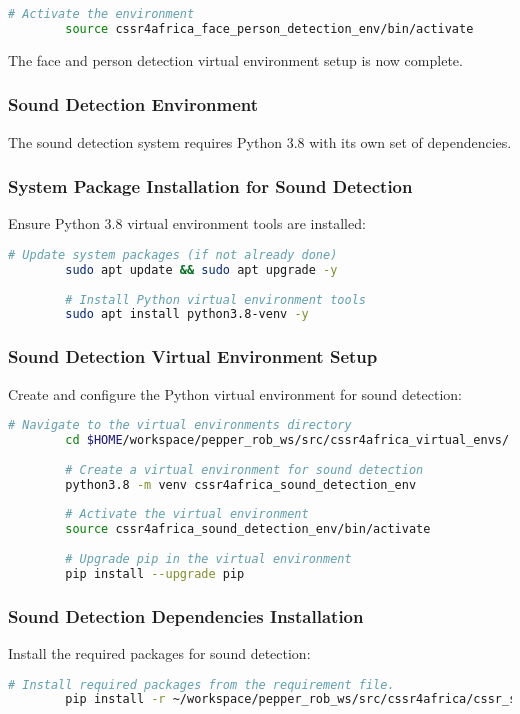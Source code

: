 \documentclass{CSSRforAfrica}
\begin{document}
{\begin{lstlisting}[style=withoutNumbering, language=bash]
		# Activate the environment
		source cssr4africa_face_person_detection_env/bin/activate
		\end{lstlisting}
		
		The face and person detection virtual environment setup is now complete.
		
		\subsubsection*{Sound Detection Environment}
		The sound detection system requires Python 3.8 with its own set of dependencies.
		
		\subsubsection*{System Package Installation for Sound Detection}
		Ensure Python 3.8 virtual environment tools are installed:
		\begin{lstlisting}[style=withoutNumbering, language=bash]
		# Update system packages (if not already done)
		sudo apt update && sudo apt upgrade -y
		
		# Install Python virtual environment tools
		sudo apt install python3.8-venv -y
		\end{lstlisting}
		
		\subsubsection*{Sound Detection Virtual Environment Setup}
		Create and configure the Python virtual environment for sound detection:
		\begin{lstlisting}[style=withoutNumbering, language=bash]
		# Navigate to the virtual environments directory
		cd $HOME/workspace/pepper_rob_ws/src/cssr4africa_virtual_envs/
		
		# Create a virtual environment for sound detection
		python3.8 -m venv cssr4africa_sound_detection_env
		
		# Activate the virtual environment
		source cssr4africa_sound_detection_env/bin/activate
		
		# Upgrade pip in the virtual environment
		pip install --upgrade pip
		\end{lstlisting}
		
		\subsubsection*{Sound Detection Dependencies Installation}
		Install the required packages for sound detection:
		\begin{lstlisting}[style=withoutNumbering, language=bash]
		# Install required packages from the requirement file.
		pip install -r ~/workspace/pepper_rob_ws/src/cssr4africa/cssr_system/sound_detection/sound_detection_requirements.txt
		\end{lstlisting}
		
}
\end{document}
